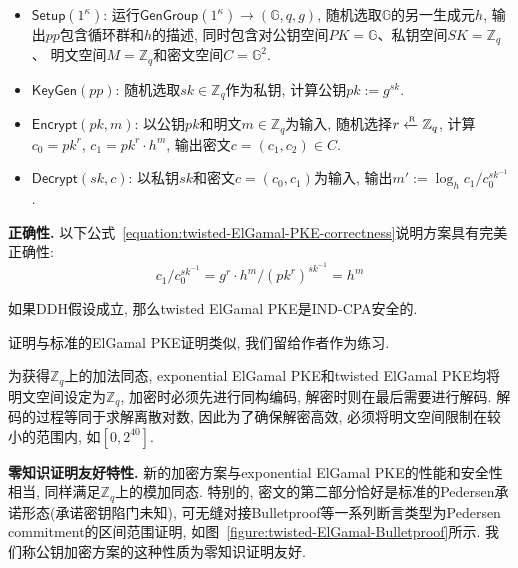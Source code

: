 \begin{definition}
\begin{itemize}
\item $\mathsf{Setup}(1^\kappa)$: 运行$\mathsf{GenGroup}(1^\kappa) \rightarrow (\mathbb{G}, q, g)$, 
	随机选取$\mathbb{G}$的另一生成元$h$,  
	输出$pp$包含循环群和$h$的描述, 同时包含对公钥空间$PK = \mathbb{G}$、私钥空间$SK = \mathbb{Z}_q$、
	明文空间$M = \mathbb{Z}_q$和密文空间$C = \mathbb{G}^2$. 

\item $\mathsf{KeyGen}(pp)$: 随机选取$sk \in \mathbb{Z}_q$作为私钥, 计算公钥$pk:= g^{sk}$. 
  
\item $\mathsf{Encrypt}(pk, m)$: 以公钥$pk$和明文$m \in \mathbb{Z}_q$为输入, 
	随机选择$r \xleftarrow{\textup{\tiny R}} \mathbb{Z}_q$, 计算$c_0 = pk^r$, $c_1 = pk^r \cdot h^m$, 输出密文$c = (c_1, c_2) \in C$. 

\item $\mathsf{Decrypt}(sk, c)$: 以私钥$sk$和密文$c = (c_0, c_1)$为输入, 输出$m':= \log_h c_1/c_0^{sk^{-1}}$.
\end{itemize}
\end{definition} 

\begin{trivlist}
\item \textbf{正确性.} 以下公式~\ref{equation:twisted-ElGamal-PKE-correctness}说明方案具有完美正确性: 
\begin{equation}\label{equation:twisted-ElGamal-PKE-correctness}
    c_1/c_0^{sk^{-1}} = g^r \cdot h^m/(pk^r)^{sk^{-1}} = h^m
\end{equation}
\end{trivlist}

\begin{theorem}\label{theorem:twisted-ElGamal-PKE-CPA}
如果DDH假设成立, 那么twisted ElGamal PKE是IND-CPA安全的. 
\end{theorem}
证明与标准的ElGamal PKE证明类似, 我们留给作者作为练习. 

\begin{note}
为获得$\mathbb{Z}_q$上的加法同态, exponential ElGamal PKE和twisted ElGamal PKE均将明文空间设定为$\mathbb{Z}_q$, 加密时必须先进行同构编码, 
解密时则在最后需要进行解码. 解码的过程等同于求解离散对数, 因此为了确保解密高效, 必须将明文空间限制在较小的范围内, 如$[0, 2^{40}]$. 
\end{note} 

\begin{trivlist}
\item \textbf{零知识证明友好特性.} 新的加密方案与exponential ElGamal PKE的性能和安全性相当, 
    同样满足$\mathbb{Z}_q$上的模加同态. 特别的, 密文的第二部分恰好是标准的Pedersen承诺形态(承诺密钥陷门未知), 
    可无缝对接Bulletproof等一系列断言类型为Pedersen commitment的区间范围证明, 如图~\ref{figure:twisted-ElGamal-Bulletproof}所示. 
    我们称公钥加密方案的这种性质为零知识证明友好. 
\end{trivlist}

